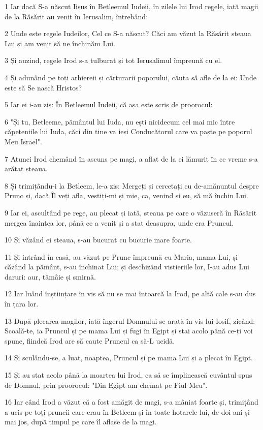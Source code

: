 \par 1 Iar dacă S-a născut Iisus în Betleemul Iudeii, în zilele lui Irod regele, iată magii de la Răsărit au venit în Ierusalim, întrebând:
\par 2 Unde este regele Iudeilor, Cel ce S-a născut? Căci am văzut la Răsărit steaua Lui și am venit să ne închinăm Lui.
\par 3 Și auzind, regele Irod s-a tulburat și tot Ierusalimul împreună cu el.
\par 4 Și adunând pe toți arhiereii și cărturarii poporului, căuta să afle de la ei: Unde este să Se nască Hristos?
\par 5 Iar ei i-au zis: În Betleemul Iudeii, că așa este scris de proorocul:
\par 6 "Și tu, Betleeme, pământul lui Iuda, nu ești nicidecum cel mai mic între căpeteniile lui Iuda, căci din tine va ieși Conducătorul care va paște pe poporul Meu Israel".
\par 7 Atunci Irod chemând în ascuns pe magi, a aflat de la ei lămurit în ce vreme s-a arătat steaua.
\par 8 Și trimițându-i la Betleem, le-a zis: Mergeți și cercetați cu de-amănuntul despre Prunc și, dacă Îl veți afla, vestiți-mi și mie, ca, venind și eu, să mă închin Lui.
\par 9 Iar ei, ascultând pe rege, au plecat și iată, steaua pe care o văzuseră în Răsărit mergea înaintea lor, până ce a venit și a stat deasupra, unde era Pruncul.
\par 10 Și văzând ei steaua, s-au bucurat cu bucurie mare foarte.
\par 11 Și intrând în casă, au văzut pe Prunc împreună cu Maria, mama Lui, și căzând la pământ, s-au închinat Lui; și deschizând vistieriile lor, I-au adus Lui daruri: aur, tămâie și smirnă.
\par 12 Iar luând înștiințare în vis să nu se mai întoarcă la Irod, pe altă cale s-au dus în țara lor.
\par 13 După plecarea magilor, iată îngerul Domnului se arată în vis lui Iosif, zicând: Scoală-te, ia Pruncul și pe mama Lui și fugi în Egipt și stai acolo până ce-ți voi spune, fiindcă Irod are să caute Pruncul ca să-L ucidă.
\par 14 Și sculându-se, a luat, noaptea, Pruncul și pe mama Lui și a plecat în Egipt.
\par 15 Și au stat acolo până la moartea lui Irod, ca să se împlinească cuvântul spus de Domnul, prin proorocul: "Din Egipt am chemat pe Fiul Meu".
\par 16 Iar când Irod a văzut că a fost amăgit de magi, s-a mâniat foarte și, trimițând a ucis pe toți pruncii care erau în Betleem și în toate hotarele lui, de doi ani și mai jos, după timpul pe care îl aflase de la magi.
